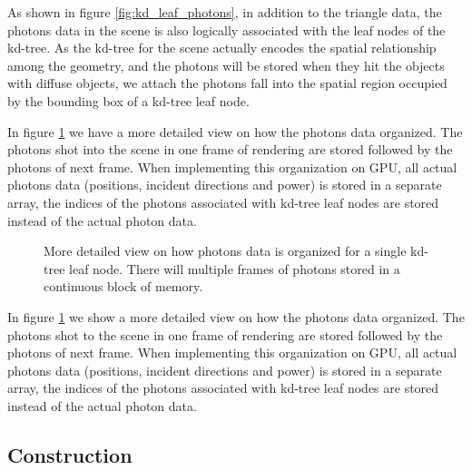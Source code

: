 As shown in figure \ref{fig:kd_leaf_photons}, in addition to the triangle data, the photons data in the scene is also logically associated with the leaf nodes of the kd-tree. As the kd-tree for the scene actually encodes the spatial relationship among the geometry, and the photons will be stored when they hit the objects with diffuse objects, we attach the photons fall into the spatial region occupied by the bounding box of a kd-tree leaf node.


In figure \ref{fig:kd_leaf_photons_2} we have a more detailed view on how the photons data organized. The photons shot into the scene in one frame of rendering are stored followed by the photons of next frame. When implementing this organization on GPU, all actual photons data (positions, incident directions and power) is stored in a separate array, the indices of the photons associated with kd-tree leaf nodes are stored instead of the actual photon data.

\begin{figure}
    \centering
    \renewcommand{\thefigure}{\thechapter.\arabic{figure}}
    \caption[Detailed view on organization of photons data for a single leaf node]{More detailed view on how photons data is organized for a single kd-tree leaf node. There will multiple frames of photons stored in a continuous block of memory.}
    \label{fig:kd_leaf_photons_2}
\end{figure}

In figure \ref{fig:kd_leaf_photons_2} we show a more detailed view on how the photons data organized. The photons shot to the scene in one frame of rendering are stored followed by the photons of next frame. When implementing this organization on GPU, all actual photons data (positions, incident directions and power) is stored in a separate array, the indices of the photons associated with kd-tree leaf nodes are stored instead of the actual photon data.

\subsection{Construction}

